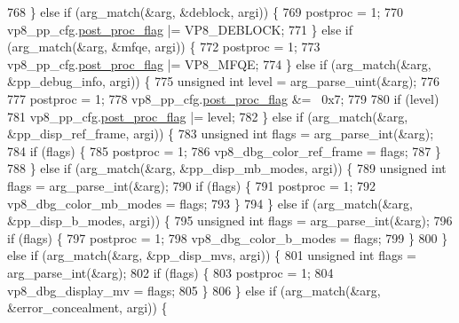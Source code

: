\begin{DoxyCodeInclude}
{{{{{{{{{{{{{{{{{{{{{{{{768     \} \textcolor{keywordflow}{else} \textcolor{keywordflow}{if} (arg\_match(&arg, &deblock, argi)) \{
769       postproc = 1;
770       vp8\_pp\_cfg.\hyperlink{structvp8__postproc__cfg_ae9adc230642ac230f39eb4c531cf85e5}{post\_proc\_flag} |= VP8\_DEBLOCK;
771     \} \textcolor{keywordflow}{else} \textcolor{keywordflow}{if} (arg\_match(&arg, &mfqe, argi)) \{
772       postproc = 1;
773       vp8\_pp\_cfg.\hyperlink{structvp8__postproc__cfg_ae9adc230642ac230f39eb4c531cf85e5}{post\_proc\_flag} |= VP8\_MFQE;
774     \} \textcolor{keywordflow}{else} \textcolor{keywordflow}{if} (arg\_match(&arg, &pp\_debug\_info, argi)) \{
775       \textcolor{keywordtype}{unsigned} \textcolor{keywordtype}{int} level = arg\_parse\_uint(&arg);
776 
777       postproc = 1;
778       vp8\_pp\_cfg.\hyperlink{structvp8__postproc__cfg_ae9adc230642ac230f39eb4c531cf85e5}{post\_proc\_flag} &= ~0x7;
779 
780       \textcolor{keywordflow}{if} (level)
781         vp8\_pp\_cfg.\hyperlink{structvp8__postproc__cfg_ae9adc230642ac230f39eb4c531cf85e5}{post\_proc\_flag} |= level;
782     \} \textcolor{keywordflow}{else} \textcolor{keywordflow}{if} (arg\_match(&arg, &pp\_disp\_ref\_frame, argi)) \{
783       \textcolor{keywordtype}{unsigned} \textcolor{keywordtype}{int} flags = arg\_parse\_int(&arg);
784       \textcolor{keywordflow}{if} (flags) \{
785         postproc = 1;
786         vp8\_dbg\_color\_ref\_frame = flags;
787       \}
788     \} \textcolor{keywordflow}{else} \textcolor{keywordflow}{if} (arg\_match(&arg, &pp\_disp\_mb\_modes, argi)) \{
789       \textcolor{keywordtype}{unsigned} \textcolor{keywordtype}{int} flags = arg\_parse\_int(&arg);
790       \textcolor{keywordflow}{if} (flags) \{
791         postproc = 1;
792         vp8\_dbg\_color\_mb\_modes = flags;
793       \}
794     \} \textcolor{keywordflow}{else} \textcolor{keywordflow}{if} (arg\_match(&arg, &pp\_disp\_b\_modes, argi)) \{
795       \textcolor{keywordtype}{unsigned} \textcolor{keywordtype}{int} flags = arg\_parse\_int(&arg);
796       \textcolor{keywordflow}{if} (flags) \{
797         postproc = 1;
798         vp8\_dbg\_color\_b\_modes = flags;
799       \}
800     \} \textcolor{keywordflow}{else} \textcolor{keywordflow}{if} (arg\_match(&arg, &pp\_disp\_mvs, argi)) \{
801       \textcolor{keywordtype}{unsigned} \textcolor{keywordtype}{int} flags = arg\_parse\_int(&arg);
802       \textcolor{keywordflow}{if} (flags) \{
803         postproc = 1;
804         vp8\_dbg\_display\_mv = flags;
805       \}
806     \} \textcolor{keywordflow}{else} \textcolor{keywordflow}{if} (arg\_match(&arg, &error\_concealment, argi)) \{
}}}}}}}}}}}}}}}}}}}}}}}}
\end{DoxyCodeInclude}
